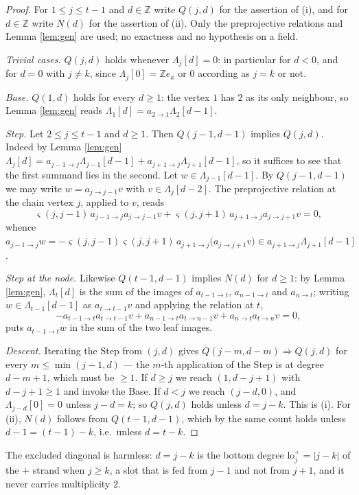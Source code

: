 \documentclass[reqno]{amsart}
\theoremstyle{plain}
\theoremstyle{definition}
\newcommand{\ka}{\kappa}
\newcommand{\lo}{\mathrm{lo}}
\begin{document}
\begin{proof}
For $1\le j\le t-1$ and $d\in\mathbb{Z}$ write $Q(j,d)$ for the assertion of
(i), and for $d\in\mathbb{Z}$ write $N(d)$ for the assertion of (ii).  Only
the preprojective relations and Lemma \ref{lem:gen} are used; no exactness and
no hypothesis on a field.

\emph{Trivial cases.}  $Q(j,d)$ holds whenever $\Lambda_j[d]=0$: in particular
for $d<0$, and for $d=0$ with $j\ne k$, since $\Lambda_j[0]=\mathbb{Z}e_\ka$
or $0$ according as $j=k$ or not.

\emph{Base.}  $Q(1,d)$ holds for every $d\ge1$: the vertex $1$ has $2$ as its
only neighbour, so Lemma \ref{lem:gen} reads
$\Lambda_1[d]=a_{2\to1}\Lambda_2[d-1]$.

\emph{Step.}  Let $2\le j\le t-1$ and $d\ge1$.  Then $Q(j-1,d-1)$ implies
$Q(j,d)$.  Indeed by Lemma \ref{lem:gen}
$\Lambda_j[d]=a_{j-1\to j}\Lambda_{j-1}[d-1]+a_{j+1\to j}\Lambda_{j+1}[d-1]$,
so it suffices to see that the first summand lies in the second.  Let
$w\in\Lambda_{j-1}[d-1]$.  By $Q(j-1,d-1)$ we may write $w=a_{j\to j-1}v$ with
$v\in\Lambda_j[d-2]$.  The preprojective relation at the chain vertex $j$,
applied to $v$, reads
\[
   \varsigma(j,j-1)\,a_{j-1\to j}a_{j\to j-1}v
  +\varsigma(j,j+1)\,a_{j+1\to j}a_{j\to j+1}v=0 ,
\]
whence
$a_{j-1\to j}w=-\varsigma(j,j-1)\varsigma(j,j+1)\,
 a_{j+1\to j}\bigl(a_{j\to j+1}v\bigr)
 \in a_{j+1\to j}\Lambda_{j+1}[d-1]$.

\emph{Step at the node.}  Likewise $Q(t-1,d-1)$ implies $N(d)$ for $d\ge1$: by
Lemma \ref{lem:gen}, $\Lambda_t[d]$ is the sum of the images of
$a_{t-1\to t}$, $a_{n-1\to t}$ and $a_{n\to t}$; writing
$w\in\Lambda_{t-1}[d-1]$ as $a_{t\to t-1}v$ and applying the relation at $t$,
\[
  -a_{t-1\to t}a_{t\to t-1}v+a_{n-1\to t}a_{t\to n-1}v+a_{n\to t}a_{t\to n}v=0,
\]
puts $a_{t-1\to t}w$ in the sum of the two leaf images.

\emph{Descent.}  Iterating the Step from $(j,d)$ gives
$Q(j-m,d-m)\Rightarrow Q(j,d)$ for every $m\le\min(j-1,d)$ --- the $m$-th
application of the Step is at degree $d-m+1$, which must be $\ge1$.  If $d\ge j$ we reach $(1,d-j+1)$ with
$d-j+1\ge1$ and invoke the Base.  If $d<j$ we reach $(j-d,0)$, and
$\Lambda_{j-d}[0]=0$ unless $j-d=k$; so $Q(j,d)$ holds unless $d=j-k$.  This
is (i).  For (ii), $N(d)$ follows from $Q(t-1,d-1)$, which by the same count
holds unless $d-1=(t-1)-k$, i.e.\ unless $d=t-k$.
\end{proof}

The excluded diagonal is harmless: $d=j-k$ is the bottom degree
$\lo^{+}_j=|j-k|$ of the $+$ strand when $j\ge k$, a slot that is fed from
$j-1$ and not from $j+1$, and it never carries multiplicity $2$.
\end{document}
